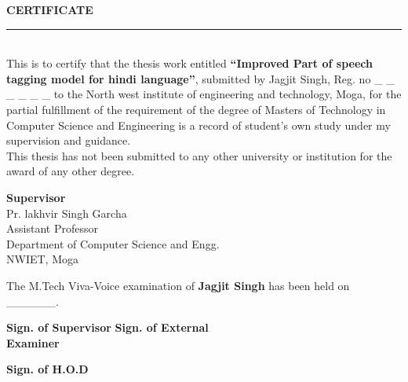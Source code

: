 \documentclass[12pt,a4paper,oneside]{memoir}
\newenvironment{certificate}%
    {\large\bfseries\centering CERTIFICATE%
    \par\medskip\normalfont\normalsize}%
    {}%
\begin{document}
\begin{certificate}
\noindent\rule{16cm}{1.0 pt} \\
\justify
This is to certify that the thesis work entitled \textbf{“Improved Part of speech tagging model for hindi language”}, submitted by Jagjit Singh, Reg. no \_ \_ \_ \_ \_ \_ to the North west institute of engineering and technology, Moga, for the partial fulfillment of the requirement of the degree of Masters of Technology in Computer Science and Engineering is a record of student’s own study under my supervision and guidance. \\

This thesis has not been submitted to any other university or institution for the award of any other degree. \\
\vspace{3 cm}

\hfill \textbf{Supervisor}\\
\vspace{0 mm}
\hfill Pr. lakhvir Singh Garcha \\
\vspace{0 mm}
\hfill Assistant Professor\\
\vspace{0 mm}
\hfill Department of Computer Science and Engg.\\
\vspace{0 mm}
\hfill NWIET, Moga\\
\vspace{2 cm}

The M.Tech Viva-Voice examination of \textbf{Jagjit Singh} has been held on  \_\_\_\_\_\_. \\

\vspace{2 cm}

\noindent \textbf{Sign. of Supervisor}   \hfill \textbf{Sign. of External} \\
\noindent  \textbf{Examiner}  \\

\vspace{2 cm} 

\noindent  \textbf{Sign. of H.O.D} 

\end{certificate}

\end{document}
